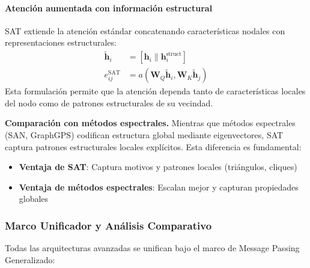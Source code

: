 \paragraph{Atención aumentada con información estructural}

\begin{definition}\label{def:sat_attention}
SAT extiende la atención estándar concatenando características nodales con representaciones estructurales:
\begin{align}
    \tilde{\mathbf{h}}_i &= [\mathbf{h}_i \| \mathbf{h}_i^{\text{struct}}] \label{eq:sat_augmented_features} \\
    e_{ij}^{\text{SAT}} &= a\left(\mathbf{W}_Q \tilde{\mathbf{h}}_i, \mathbf{W}_K \tilde{\mathbf{h}}_j\right) \label{eq:sat_attention_score}
\end{align}
Esta formulación permite que la atención dependa tanto de características locales del nodo como de patrones estructurales de su vecindad.
\end{definition}

\textbf{Comparación con métodos espectrales.}\label{rem:sat_vs_spectral} Mientras que métodos espectrales (SAN, GraphGPS) codifican estructura global mediante eigenvectores, SAT captura patrones estructurales locales explícitos. Esta diferencia es fundamental:
\begin{itemize}
    \item \textbf{Ventaja de SAT}: Captura motivos y patrones locales (triángulos, cliques)
    \item \textbf{Ventaja de métodos espectrales}: Escalan mejor y capturan propiedades globales
\end{itemize}

\subsubsection{Marco Unificador y Análisis Comparativo}\label{subsubsec:unified_framework_advanced}

Todas las arquitecturas avanzadas se unifican bajo el marco de Message Passing Generalizado:

